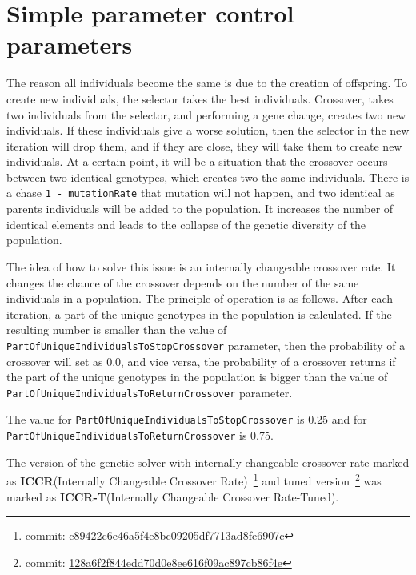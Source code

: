 \section{Simple parameter control parameters}

The reason all individuals become the same is due to the creation of offspring. To create new individuals, the selector takes the best individuals. Crossover, takes two individuals from the selector, and performing a gene change, creates two new individuals. If these individuals give a worse solution, then the selector in the new iteration will drop them, and if they are close, they will take them to create new individuals. At a certain point, it will be a situation that the crossover occurs between two identical genotypes, which creates two the same individuals. There is a chase \texttt{1~-~mutationRate} that mutation will not happen, and two identical as parents individuals will be added to the population. It increases the number of identical elements and leads to the collapse of the genetic diversity of the population.

The idea of how to solve this issue is an internally changeable crossover rate. It changes the chance of the crossover depends on the number of the same individuals in a population. 
The principle of operation is as follows. After each iteration, a part of the unique genotypes in the population is calculated. If the resulting number is smaller than the value of \texttt{PartOfUniqueIndividualsToStopCrossover} parameter, then the probability of a crossover will set as 0.0, and vice versa, the probability of a crossover returns if the part of the unique genotypes in the population is bigger than the value of \texttt{PartOfUniqueIndividualsToReturnCrossover} parameter.

The value for \texttt{PartOfUniqueIndividualsToStopCrossover} is 0.25 and for \texttt{PartOfUniqueIndividualsToReturnCrossover} is 0.75.

The version of the genetic solver with internally changeable crossover rate marked as \textbf{ICCR}(Internally Changeable Crossover Rate)~\footnote{commit: \href{https://git-st.inf.tu-dresden.de/mquat/mquat2/commit/c89422c6e46a5f4e8bc09205df7713ad8fe6907c}{c89422c6e46a5f4e8bc09205df7713ad8fe6907c}} and tuned version~\footnote{commit: \href{https://git-st.inf.tu-dresden.de/mquat/mquat2/commit/128a6f2f844edd70d0e8ee616f09ac897cb86f4e}{128a6f2f844edd70d0e8ee616f09ac897cb86f4e}} was marked as \textbf{ICCR-T}(Internally Changeable Crossover Rate-Tuned).

